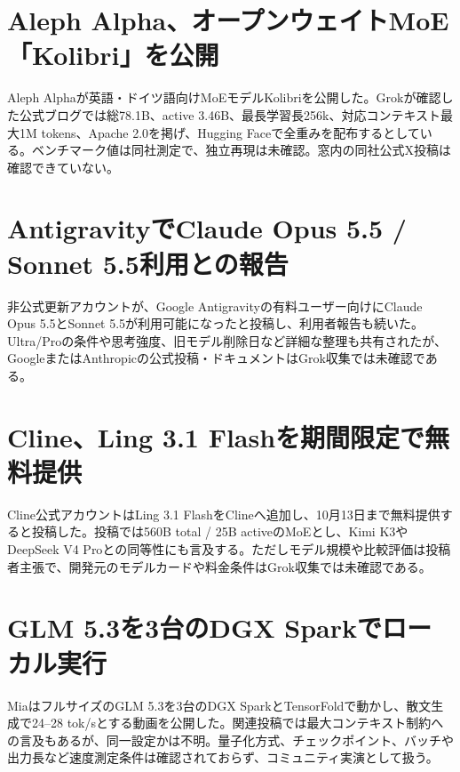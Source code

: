 \section{Aleph Alpha、オープンウェイトMoE「Kolibri」を公開}
Aleph Alphaが英語・ドイツ語向けMoEモデルKolibriを公開した。Grokが確認した公式ブログでは総78.1B、active 3.46B、最長学習長256k、対応コンテキスト最大1M tokens、Apache 2.0を掲げ、Hugging Faceで全重みを配布するとしている。ベンチマーク値は同社測定で、独立再現は未確認。窓内の同社公式X投稿は確認できていない。

\section{AntigravityでClaude Opus 5.5 / Sonnet 5.5利用との報告}
非公式更新アカウントが、Google Antigravityの有料ユーザー向けにClaude Opus 5.5とSonnet 5.5が利用可能になったと投稿し、利用者報告も続いた。Ultra/Proの条件や思考強度、旧モデル削除日など詳細な整理も共有されたが、GoogleまたはAnthropicの公式投稿・ドキュメントはGrok収集では未確認である。

\section{Cline、Ling 3.1 Flashを期間限定で無料提供}
Cline公式アカウントはLing 3.1 FlashをClineへ追加し、10月13日まで無料提供すると投稿した。投稿では560B total / 25B activeのMoEとし、Kimi K3やDeepSeek V4 Proとの同等性にも言及する。ただしモデル規模や比較評価は投稿者主張で、開発元のモデルカードや料金条件はGrok収集では未確認である。

\section{GLM 5.3を3台のDGX Sparkでローカル実行}
MiaはフルサイズのGLM 5.3を3台のDGX SparkとTensorFoldで動かし、散文生成で24--28 tok/sとする動画を公開した。関連投稿では最大コンテキスト制約への言及もあるが、同一設定かは不明。量子化方式、チェックポイント、バッチや出力長など速度測定条件は確認されておらず、コミュニティ実演として扱う。

